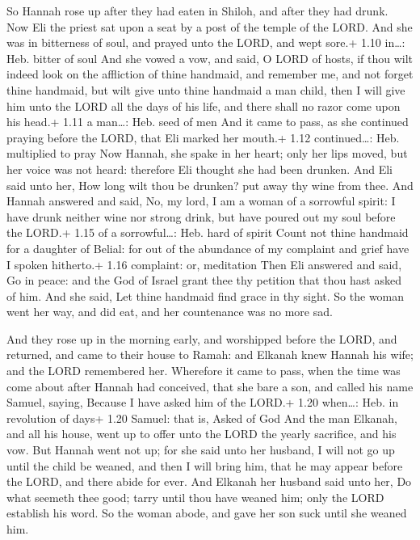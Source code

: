  So Hannah rose up after they had eaten in Shiloh, and
after they had drunk. Now Eli the priest sat upon a seat by a post of
the temple of the LORD.  And she was in bitterness of soul,
and prayed unto the LORD, and wept sore.+ 1.10 in\ldots: Heb. bitter of
soul  And she vowed a vow, and said, O LORD of hosts, if
thou wilt indeed look on the affliction of thine handmaid, and remember
me, and not forget thine handmaid, but wilt give unto thine handmaid a
man child, then I will give him unto the LORD all the days of his life,
and there shall no razor come upon his head.+ 1.11 a man\ldots: Heb.
seed of men  And it came to pass, as she continued praying
before the LORD, that Eli marked her mouth.+ 1.12 continued\ldots: Heb.
multiplied to pray  Now Hannah, she spake in her heart;
only her lips moved, but her voice was not heard: therefore Eli thought
she had been drunken.  And Eli said unto her, How long wilt
thou be drunken? put away thy wine from thee.  And Hannah
answered and said, No, my lord, I am a woman of a sorrowful spirit: I
have drunk neither wine nor strong drink, but have poured out my soul
before the LORD.+ 1.15 of a sorrowful\ldots: Heb. hard of spirit
 Count not thine handmaid for a daughter of Belial: for out
of the abundance of my complaint and grief have I spoken hitherto.+ 1.16
complaint: or, meditation  Then Eli answered and said, Go
in peace: and the God of Israel grant thee thy petition that thou hast
asked of him.  And she said, Let thine handmaid find grace
in thy sight. So the woman went her way, and did eat, and her
countenance was no more sad.

 And they rose up in the morning early, and worshipped
before the LORD, and returned, and came to their house to Ramah: and
Elkanah knew Hannah his wife; and the LORD remembered her. 
Wherefore it came to pass, when the time was come about after Hannah had
conceived, that she bare a son, and called his name Samuel, saying,
Because I have asked him of the LORD.+ 1.20 when\ldots: Heb. in
revolution of days+ 1.20 Samuel: that is, Asked of God  And
the man Elkanah, and all his house, went up to offer unto the LORD the
yearly sacrifice, and his vow.  But Hannah went not up; for
she said unto her husband, I will not go up until the child be weaned,
and then I will bring him, that he may appear before the LORD, and there
abide for ever.  And Elkanah her husband said unto her, Do
what seemeth thee good; tarry until thou have weaned him; only the LORD
establish his word. So the woman abode, and gave her son suck until she
weaned him.


